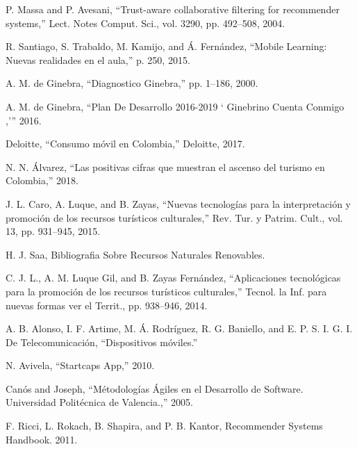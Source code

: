 \documentclass[12pt,letterpaper,openany]{book}
\begin{document}
\cleardoublepage
{}
\begin{thebibliography}{1}
 P. Massa and P. Avesani, “Trust-aware collaborative filtering for recommender systems,” Lect. Notes Comput. Sci., vol. 3290, pp. 492–508, 2004.

 R. Santiago, S. Trabaldo, M. Kamijo, and Á. Fernández, “Mobile Learning: Nuevas realidades en el aula,” p. 250, 2015.

 A. M. de Ginebra, “Diagnostico Ginebra,” pp. 1–186, 2000.

 A. M. de Ginebra, “Plan De Desarrollo 2016-2019 ‘ Ginebrino Cuenta Conmigo ,’” 2016.

 Deloitte, “Consumo móvil en Colombia,” Deloitte, 2017.

 N. N. Álvarez, “Las positivas cifras que muestran el ascenso del turismo en Colombia,” 2018. 

 J. L. Caro, A. Luque, and B. Zayas, “Nuevas tecnologías para la interpretación y promoción de los recursos turísticos culturales,” Rev. Tur. y Patrim. Cult., vol. 13, pp. 931–945, 2015.

 H. J. Saa, Bibliografia Sobre Recursos Naturales Renovables.

 C. J. L., A. M. Luque Gil, and B. Zayas Fernández, “Aplicaciones tecnológicas para la promoción de los recursos turísticos culturales,” Tecnol. la Inf. para nuevas formas ver el Territ., pp. 938–946, 2014.

 A. B. Alonso, I. F. Artime, M. Á. Rodríguez, R. G. Baniello, and E. P. S. I. G. I. De Telecomunicación, “Dispositivos móviles.”

 N. Avivela, “Startcaps App,” 2010.

 Canós and Joseph, “Métodologías Ágiles en el Desarrollo de Software. Universidad Politécnica de Valencia.,” 2005.

 F. Ricci, L. Rokach, B. Shapira, and P. B. Kantor, Recommender Systems Handbook. 2011.


\end{thebibliography}
\end{document}
